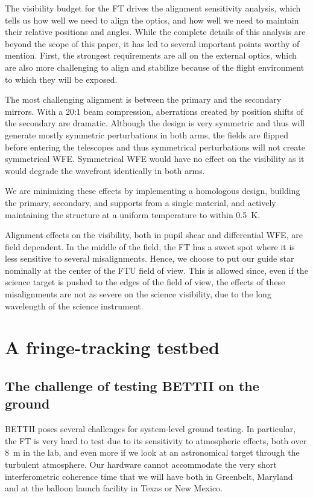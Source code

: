 The visibility budget for the FT drives the alignment sensitivity analysis, which tells us how well we need to align the optics, and how well we need to maintain their relative positions and angles. While the complete details of this analysis are beyond the scope of this paper, it has led to several important points worthy of mention. First, the strongest  requirements are all on the external optics, which are also more challenging to align and stabilize because of the flight environment to which they will be exposed.

The most challenging alignment is between the primary and the secondary mirrors. With a 20:1 beam compression, aberrations created by position shifts of the secondary are dramatic. Although the design is very symmetric and thus will generate mostly symmetric perturbations in both arms, the fields are flipped before entering the telescopes and thus symmetrical perturbations will not create symmetrical WFE. Symmetrical WFE would have no effect on the visibility as it would degrade the wavefront identically in both arms. 

We are minimizing these effects by implementing a homologous design, building the primary, secondary, and supports from a single material, and actively maintaining the structure at a uniform temperature to within 0.5~K.

Alignment effects on the visibility, both in pupil shear and differential WFE, are field dependent. In the middle of the field, the FT has a sweet spot where it is less sensitive to several misalignments. Hence, we choose to put our guide star nominally at the center of the FTU field of view. This is allowed since, even if the science target is pushed to the edges of the field of view, the effects of these misalignments are not as severe on the science visibility, due to the long wavelength of the science instrument.





\section{A fringe-tracking testbed} \label{sec:TESTBED}
\subsection{The challenge of testing BETTII on the ground}
BETTII poses several challenges for system-level ground testing. In particular, the FT is very hard to test due to its sensitivity to atmospheric effects, both over 8~m in the lab, and even more if we look at an astronomical target through the turbulent atmosphere. Our hardware cannot accommodate the very short interferometric coherence time that we will have both in Greenbelt, Maryland and at the balloon launch facility in Texas or New Mexico. 


